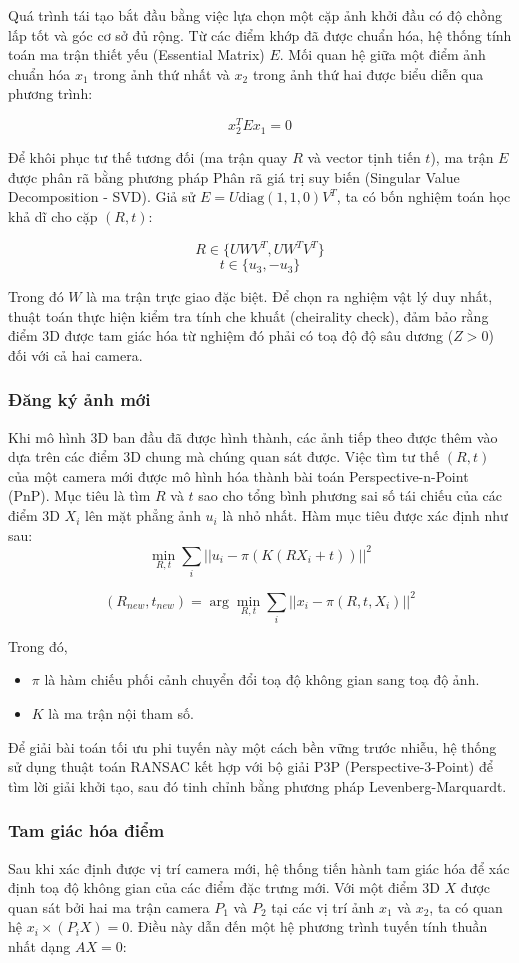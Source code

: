 Quá trình tái tạo bắt đầu bằng việc lựa chọn một cặp ảnh khởi đầu có độ chồng lấp tốt và góc cơ sở đủ rộng. Từ các điểm khớp đã được chuẩn hóa, hệ thống tính toán ma trận thiết yếu (Essential Matrix) $E$. Mối quan hệ giữa một điểm ảnh chuẩn hóa $x_1$ trong ảnh thứ nhất và $x_2$ trong ảnh thứ hai được biểu diễn qua phương trình:

$$x_2^T E x_1 = 0$$

Để khôi phục tư thế tương đối (ma trận quay $R$ và vector tịnh tiến $t$), ma trận $E$ được phân rã bằng phương pháp Phân rã giá trị suy biến (Singular Value Decomposition - SVD). Giả sử $E = U \text{diag}(1, 1, 0) V^T$, ta có bốn nghiệm toán học khả dĩ cho cặp $(R, t)$:

$$R \in \{U W V^T, U W^T V^T\}$$$$t \in \{u_3, -u_3\}$$

Trong đó $W$ là ma trận trực giao đặc biệt. Để chọn ra nghiệm vật lý duy nhất, thuật toán thực hiện kiểm tra tính che khuất (cheirality check), đảm bảo rằng điểm 3D được tam giác hóa từ nghiệm đó phải có toạ độ độ sâu dương ($Z > 0$) đối với cả hai camera.

\subsubsection{Đăng ký ảnh mới}
Khi mô hình 3D ban đầu đã được hình thành, các ảnh tiếp theo được thêm vào dựa trên các điểm 3D chung mà chúng quan sát được. Việc tìm tư thế $(R, t)$ của một camera mới được mô hình hóa thành bài toán Perspective-n-Point (PnP). Mục tiêu là tìm $R$ và $t$ sao cho tổng bình phương sai số tái chiếu của các điểm 3D $X_i$ lên mặt phẳng ảnh $u_i$ là nhỏ nhất. Hàm mục tiêu được xác định như sau:
$$\min_{R, t} \sum_{i} || u_i - \pi(K(RX_i + t)) ||^2$$

$$(R_{new}, t_{new}) = \arg \min_{R, t} \sum_{i} || x_i - \pi(R, t, X_i) ||^2$$

Trong đó,
\begin{itemize}
    \item $\pi$ là hàm chiếu phối cảnh chuyển đổi toạ độ không gian sang toạ độ ảnh.
    \item $K$ là ma trận nội tham số.
\end{itemize}

Để giải bài toán tối ưu phi tuyến này một cách bền vững trước nhiễu, hệ thống sử dụng thuật toán RANSAC kết hợp với bộ giải P3P (Perspective-3-Point) để tìm lời giải khởi tạo, sau đó tinh chỉnh bằng phương pháp Levenberg-Marquardt.

\subsubsection{Tam giác hóa điểm}
Sau khi xác định được vị trí camera mới, hệ thống tiến hành tam giác hóa để xác định toạ độ không gian của các điểm đặc trưng mới. Với một điểm 3D $X$ được quan sát bởi hai ma trận camera $P_1$ và $P_2$ tại các vị trí ảnh $x_1$ và $x_2$, ta có quan hệ $x_i \times (P_i X) = 0$. Điều này dẫn đến một hệ phương trình tuyến tính thuần nhất dạng $AX = 0$:

